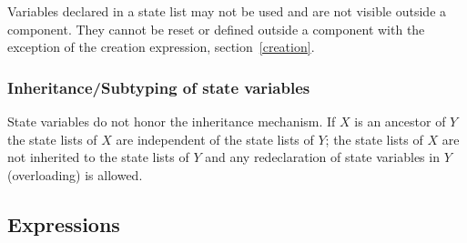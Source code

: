Variables declared in a state list may not be used and are not visible
outside a component.  They cannot be reset or defined outside a
component with the exception of the creation expression,
section~\ref{creation}.  

\subsubsection{Inheritance/Subtyping of state variables\label{inherit_local}}

%
State variables do not honor the inheritance mechanism.  If $X$ is an
ancestor of $Y$ the state lists of $X$ are independent of the state
lists of $Y$; the state lists of $X$ are not inherited to the state
lists of $Y$ and any redeclaration of state variables in $Y$
(overloading) is allowed. 


\subsection{Expressions\label{expressions}}

